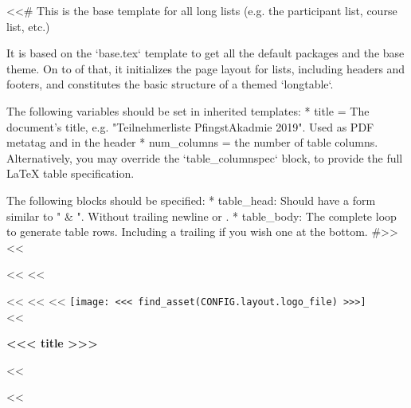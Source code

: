 <<# This is the base template for all long lists (e.g. the participant list, course list, etc.)

    It is based on the `base.tex` template to get all the default packages and the base theme. On to of that, it
    initializes the page layout for lists, including headers and footers, and constitutes the basic structure of a
    themed `longtable`.

    The following variables should be set in inherited templates:
      * title = The document's title, e.g. "Teilnehmerliste PfingstAkadmie 2019". Used as PDF metatag and in the header
      * num_columns = the number of table columns. Alternatively, you may override the `table_columnspec` block, to
        provide the full LaTeX table specification.

    The following blocks should be specified:
      * table_head: Should have a form similar to " & ". Without trailing newline
        or \hline.
      * table_body: The complete loop to generate table rows. Including a trailing \hline if you wish one at the bottom.
#>>
<<%

<<%
    \cfoot[]{}
<<%

<<%
    \thispagestyle{plain}
    <<%
        <<%
            \hspace*{\fill}\texttt{[image: <<< find\_asset(CONFIG.layout.logo\_file) >>>]}\\

            \vspace{-2cm}
        <<%
        \begin{center}
            \headingfamily\bfseries\huge{}<<< title >>>
        \end{center}
    <<%

<<%
